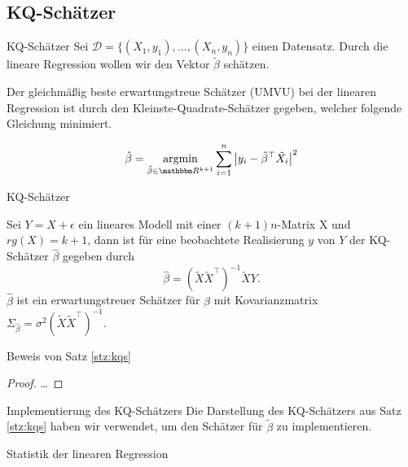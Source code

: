 \subsection{KQ-Schätzer}
\begin{frame}{KQ-Schätzer}
Sei $\mathcal{D}=\{(X_1,y_1),\dots,(X_n,y_n)\}$ einen Datensatz. Durch die lineare Regression wollen wir den Vektor  $\tilde{\beta}$ schätzen.

Der gleichmäßig beste erwartungstreue Schätzer (UMVU) bei der linearen Regression ist durch den Kleinste-Quadrate-Schätzer gegeben, welcher folgende Gleichung minimiert.

\pause
\begin{equation}
    \hat{\beta} = \argmin_{\tilde{\beta}\in\R^{k+1}}\sum_{i=1}^n\left|y_i-\tilde{\beta}^\top\tilde{X}_i\right|^2
\end{equation}
\end{frame}

\begin{frame}{KQ-Schätzer}
\begin{satz}\label{stz:kqs}
    Sei $Y = X + \epsilon$ ein lineares Modell
    mit einer $(k + 1)n$-Matrix X und $rg(X) = k + 1$, dann ist für eine beobachtete Realisierung
    $y$ von $Y$ der KQ-Schätzer $\hat{\beta}$ gegeben durch
    $$\hat{\beta}=(\tilde{X}\tilde{X}^\top)^{-1}\tilde{X}Y.$$
    $\hat{\beta}$ ist ein erwartungstreuer Schätzer für $\beta$ mit Kovarianzmatrix $\Sigma_{\hat{\beta}} = \sigma^2(\tilde{X}\tilde{X}^\top)^{-1}$.
\end{satz}
\end{frame}
\begin{frame}{Beweis von Satz \ref{stz:kqs}}
    \begin{proof}
        \dots
    \end{proof}
\end{frame}

\begin{frame}{Implementierung des KQ-Schätzers}
Die Darstellung des KQ-Schätzers aus Satz \ref{stz:kqs} haben wir verwendet, um den Schätzer für $\tilde{\beta}$ zu implementieren.
\pause

\end{frame}

\begin{frame}{Statistik der linearen Regression}
\scriptsize
\begin{table}[]
    
    \caption{ Zusammenfassung der OLS Regressions Statistik.}
    \label{tab:regression}
\end{table} 
\end{frame}

